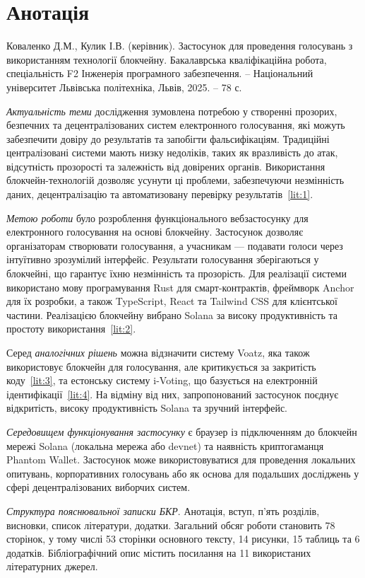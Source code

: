 \documentclass[14pt]{extreport}
\newcommand{\gq}[1]{\guillemotleft{}#1\guillemotright{}}
\newcommand{\plainchap}[1]{
  \chapter*{#1}
}
\begin{document}
  \plainchap{Анотація}
  
  Коваленко Д.М., Кулик І.В. (керівник). Застосунок для проведення голосувань з використанням технології блокчейну. Бакалаврська кваліфікаційна робота, спеціальність F2 \gq{Інженерія програмного забезпечення}. – Національний університет \gq{Львівська політехніка}, Львів, 2025. – 78 с.
  
  \textit{Актуальність теми} дослідження зумовлена потребою у створенні прозорих, безпечних та децентралізованих систем електронного голосування, які можуть забезпечити довіру до результатів та запобігти фальсифікаціям. Традиційні централізовані системи мають низку недоліків, таких як вразливість до атак, відсутність прозорості та залежність від довірених органів. Використання блокчейн-технологій дозволяє усунути ці проблеми, забезпечуючи незмінність даних, децентралізацію та автоматизовану перевірку результатів~\ref{lit:1}.

  \textit{Метою роботи} було розроблення функціонального вебзастосунку для електронного голосування на основі блокчейну. Застосунок дозволяє організаторам створювати голосування, а учасникам — подавати голоси через інтуїтивно зрозумілий інтерфейс. Результати голосування зберігаються у блокчейні, що гарантує їхню незмінність та прозорість. Для реалізації системи використано мову програмування Rust для смарт-контрактів, фреймворк Anchor для їх розробки, а також TypeScript, React та Tailwind CSS для клієнтської частини. Реалізацією блокчейну вибрано Solana за високу продуктивність та простоту використання~\ref{lit:2}.

  Серед \textit{аналогічних рішень} можна відзначити систему Voatz, яка також використовує блокчейн для голосування, але критикується за закритість коду~\ref{lit:3}, та естонську систему i-Voting, що базується на електронній ідентифікації~\ref{lit:4}. На відміну від них, запропонований застосунок поєднує відкритість, високу продуктивність Solana та зручний інтерфейс.

  \textit{Середовищем функціонування застосунку} є браузер із підключенням до блокчейн мережі Solana (локальна мережа або devnet) та наявність криптогаманця Phantom Wallet. Застосунок може використовуватися для проведення локальних опитувань, корпоративних голосувань або як основа для подальших досліджень у сфері децентралізованих виборчих систем.

  \textit{Структура пояснювальної записки БКР}. Анотація, вступ, п’ять розділів, висновки, список літератури, додатки. Загальний обсяг роботи становить 78 сторінок, у тому числі 53 сторінки основного тексту, 14 рисунки, 15 таблиць та 6 додатків. Бібліографічний опис містить посилання на 11 використаних літературних джерел.
\end{document}
